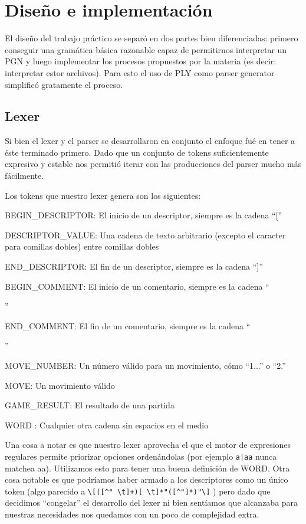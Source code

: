 \section{Diseño e implementación}

El diseño del trabajo práctico se separó en dos partes bien diferenciadas: primero conseguir una gramática básica razonable capaz de permitirnos interpretar un PGN y luego implementar los procesos propuestos por la materia (es decir: interpretar estor archivos). Para esto el uso de PLY como parser generator simplificó gratamente el proceso.

\subsection{Lexer}

Si bien el lexer y el parser se desarrollaron en conjunto el enfoque fué en tener a éste terminado primero. Dado que un conjunto de tokens suficientemente expresivo y estable nos permitió iterar con las producciones del parser mucho más fácilmente.

Los tokens que nuestro lexer genera son los siguientes:
\begin{itemize}
    \item BEGIN\_DESCRIPTOR: El inicio de un descriptor, siempre es la cadena ``[''
    \item DESCRIPTOR\_VALUE: Una cadena de texto arbitrario (excepto el caracter para comillas dobles) entre comillas dobles
    \item END\_DESCRIPTOR: El fin de un descriptor, siempre es la cadena ``]''
    \item BEGIN\_COMMENT: El inicio de un comentario, siempre es la cadena ``{''
    \item END\_COMMENT: El fin de un comentario, siempre es la cadena ``}''
    \item MOVE\_NUMBER: Un número válido para un movimiento, cómo ``1...'' o ``2.''
    \item MOVE: Un movimiento válido
    \item GAME\_RESULT: El resultado de una partida
    \item WORD : Cualquier otra cadena sin espacios en el medio
\end{itemize}
    
    
Una cosa a notar es que nuestro lexer aprovecha el que el motor de expresiones regulares permite priorizar opciones ordenándolas (por ejemplo \verb/a|aa/ nunca matchea aa). Utilizamos esto para tener una buena definición de WORD. Otra cosa notable es que podríamos haber armado a los descriptores como un único token (algo parecido a \verb/\[([^" \t]+)[ \t]*"([^"]*)"\]/ )  pero dado que decidimos ``congelar'' el desarrollo del lexer ni bien sentíamos que alcanzaba para nuestras necesidades nos quedamos con un poco de complejidad extra.

